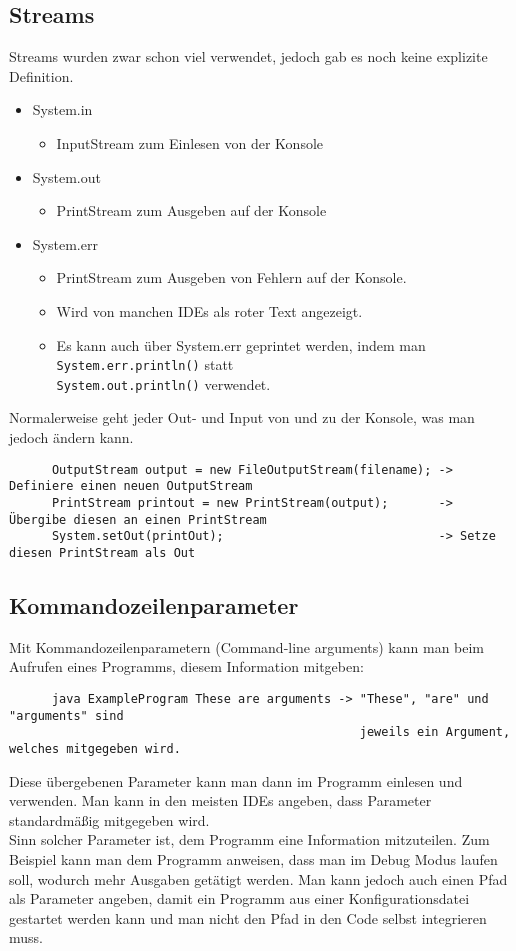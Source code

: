 \documentclass{article}
\begin{document}
	  \subsection{Streams}
	  Streams wurden zwar schon viel verwendet, jedoch gab es noch keine explizite Definition.
	  \begin{itemize}
	  	\item{System.in}
	  	\begin{itemize}
	  		\item{InputStream zum Einlesen von der Konsole}
	  	\end{itemize}
	  	\item{System.out}
	  	\begin{itemize}
	  		\item{PrintStream zum Ausgeben auf der Konsole}
	  	\end{itemize}
	  	\item{System.err}
	  	\begin{itemize}
	  		\item{PrintStream zum Ausgeben von Fehlern auf der Konsole.}
	  		\item{Wird von manchen IDEs als roter Text angezeigt.}
	  		\item{Es kann auch über System.err geprintet werden, indem man \verb|System.err.println()| statt\\ \verb|System.out.println()| verwendet.}
	  	\end{itemize}
	  \end{itemize}
	  Normalerweise geht jeder Out- und Input von und zu der Konsole, was man jedoch ändern kann.
	  \begin{verbatim}
	  OutputStream output = new FileOutputStream(filename); -> Definiere einen neuen OutputStream
	  PrintStream printout = new PrintStream(output);       -> Übergibe diesen an einen PrintStream
	  System.setOut(printOut);                              -> Setze diesen PrintStream als Out
	  \end{verbatim}
	  \subsection{Kommandozeilenparameter}
	  Mit Kommandozeilenparametern (Command-line arguments) kann man beim Aufrufen eines Programms, diesem Information mitgeben:
	  \begin{verbatim}
	  java ExampleProgram These are arguments -> "These", "are" und "arguments" sind 
	                                             jeweils ein Argument, welches mitgegeben wird.
	  \end{verbatim}
	  Diese übergebenen Parameter kann man dann im Programm einlesen und verwenden. Man kann in den meisten IDEs angeben, dass Parameter standardmäßig mitgegeben wird. \\
	  Sinn solcher Parameter ist, dem Programm eine Information mitzuteilen. Zum Beispiel kann man dem Programm anweisen, dass man im Debug Modus laufen soll, wodurch mehr Ausgaben getätigt werden. Man kann jedoch auch einen Pfad als Parameter angeben, damit ein Programm aus einer Konfigurationsdatei gestartet werden kann und man nicht den Pfad in den Code selbst integrieren muss.
\end{document}
